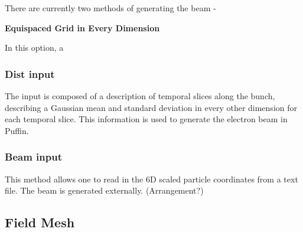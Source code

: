 \documentclass[12pt]{article}%
\begin{document}
% 


There are currently two methods of generating the beam -

{\bf Equispaced Grid in Every Dimension}

In this option, a


\subsubsection{Dist input}

The input is composed of a description of temporal slices along the bunch, describing a Gaussian mean and standard deviation in every other dimension for each temporal slice. This information is used to generate the electron beam in Puffin.


\subsubsection{Beam input}

This method allows one to read in the 6D scaled particle coordinates from a text file. The beam is generated externally. (Arrangement?)




\subsection{Field Mesh}
\end{document}
